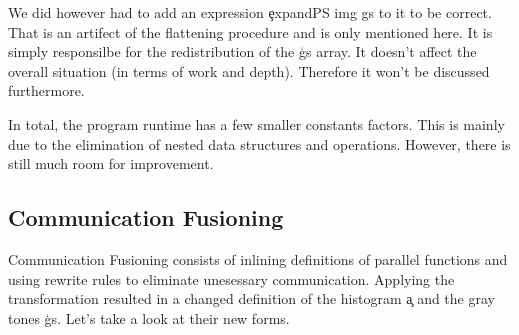     We did however had to add an expression \c{expandPS img gs} to it to be
    correct. That is an artifect of the flattening procedure and
    is only mentioned here. It is simply responsilbe
    for the redistribution of the \c{gs} array. It doesn't affect the
    overall situation (in terms of work and depth). Therefore it won't be discussed furthermore.
    
    In total, the program runtime has a few smaller constants factors. This is mainly due to the elimination of nested data structures
    and operations. However, there is still much room for improvement.
  \subsection{Communication Fusioning}
    
    Communication Fusioning consists of inlining definitions of parallel functions and using rewrite rules to eliminate
    unesessary communication. Applying the transformation resulted in a changed definition of the histogram \c{a} and the
    gray tones \c{gs}. Let's take a look at their new forms.
    
